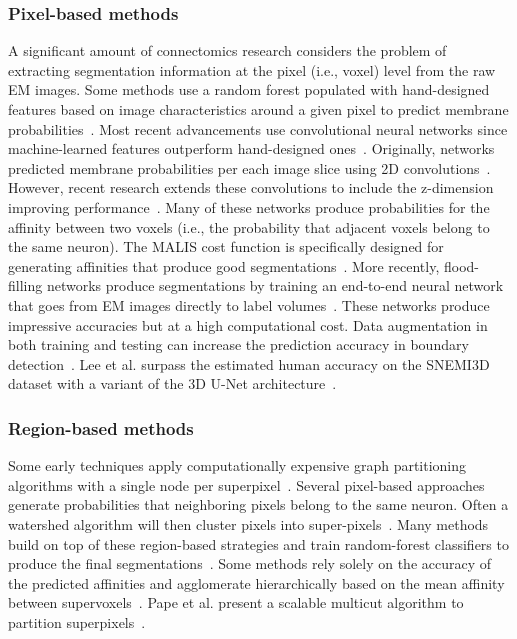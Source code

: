 \subsubsection{Pixel-based methods}
A significant amount of connectomics research considers the problem of extracting segmentation information at the pixel (i.e., voxel) level from the raw EM images. 
Some methods use a random forest populated with hand-designed features based on image characteristics around a given pixel to predict membrane probabilities~\cite{kaynig2015large}.
Most recent advancements use convolutional neural networks since machine-learned features outperform hand-designed ones~\cite{bogovic2013learned}.
Originally, networks predicted membrane probabilities per each image slice using 2D convolutions~\cite{seymour2016rhoananet,ronneberger2015u,ciresan2012deep,jain2010boundary,kaynig2015large,amelio_segmentation}.
However, recent research extends these convolutions to include the z-dimension improving performance~\cite{lee2015recursive,parag2017anisotropic,cciccek20163d,turaga2010convolutional}.
Many of these networks produce probabilities for the affinity between two voxels (i.e., the probability that adjacent voxels belong to the same neuron). 
The MALIS cost function is specifically designed for generating affinities that produce good segmentations~\cite{briggman2009maximin}. 
More recently, flood-filling networks produce segmentations by training an end-to-end neural network that goes from EM images directly to label volumes~\cite{januszewski2016flood}. 
These networks produce impressive accuracies but at a high computational cost.
Data augmentation in both training and testing can increase the prediction accuracy in boundary detection~\cite{zeng2017deepem3d}.
Lee et al. surpass the estimated human accuracy on the SNEMI3D dataset with a variant of the 3D U-Net architecture~\cite{lee2017superhuman}.

\subsubsection{Region-based methods}
Some early techniques apply computationally expensive graph partitioning algorithms with a single node per superpixel~\cite{andres2012globally}. 
Several pixel-based approaches generate probabilities that neighboring pixels belong to the same neuron.
Often a watershed algorithm will then cluster pixels into super-pixels~\cite{zlateski2015image}.
Many methods build on top of these region-based strategies and train random-forest classifiers to produce the final segmentations~\cite{seymour2016rhoananet,nunez2014graph,parag2017anisotropic,zlateski2015image,10.1371/journal.pone.0125825}.
Some methods rely solely on the accuracy of the predicted affinities and agglomerate hierarchically based on the mean affinity between supervoxels~\cite{lee2017superhuman,funke2017deep}.
Pape et al. present a scalable multicut algorithm to partition superpixels~\cite{beier2017multicut}.

